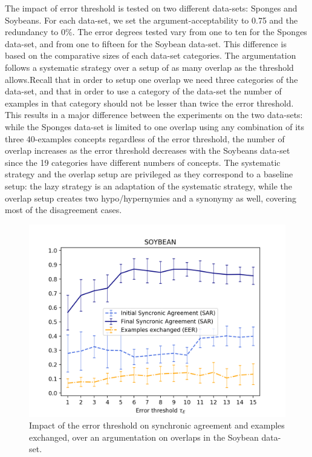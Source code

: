 The impact of error threshold is tested on two different data-sets: Sponges and Soybeans. For each data-set, we set the argument-acceptability to 0.75 and the redundancy to $0\%$. The error degrees tested vary from one to ten for the Sponges data-set, and from one to fifteen for the Soybean data-set. This difference is based on the comparative sizes of each data-set categories. The argumentation follows a systematic strategy over a setup of as many overlap as the threshold allows.Recall that in order to setup one overlap we need three categories of the data-set, and that in order to use a category of the data-set the number of examples in that category should not be lesser than twice the error threshold. This results in a major difference between the experiments on the two data-sets: while the Sponges data-set is limited to one overlap using any combination of its three 40-examples concepts regardless of the error threshold, the number of overlap increases as the error threshold decreases with the Soybeans data-set since the 19 categories have different numbers of concepts. The systematic strategy and the overlap setup are privileged as they correspond to a baseline setup: the lazy strategy is an adaptation of the systematic strategy, while the overlap setup creates two hypo/hypernymies and a synonymy as well, covering most of the disagreement cases.

\begin{figure}[t]
    \centering
    \includegraphics[width = \textwidth]{figs/threshold_SOY.png}
    \caption{Impact of the error threshold on synchronic agreement and examples exchanged, over an argumentation on overlaps in the Soybean data-set.}
    \label{fig:threshold_soy}
\end{figure}

